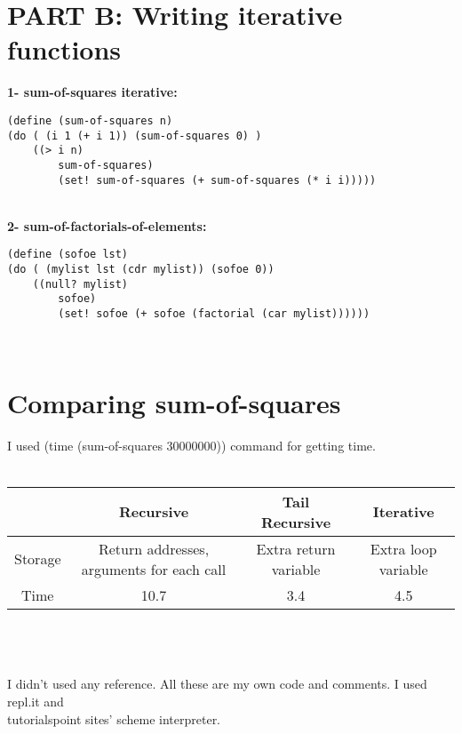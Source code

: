 \documentclass[11pt]{article}
\begin{document}
\section*{PART B: Writing iterative functions}

{\bf 1- sum-of-squares iterative:}\\
\begin{lstlisting}
(define (sum-of-squares n)
(do ( (i 1 (+ i 1)) (sum-of-squares 0) )
    ((> i n) 
        sum-of-squares)
        (set! sum-of-squares (+ sum-of-squares (* i i)))))
\end{lstlisting}
~\\
{\bf 2- sum-of-factorials-of-elements:}\\
\begin{lstlisting}
(define (sofoe lst)
(do ( (mylist lst (cdr mylist)) (sofoe 0))
    ((null? mylist) 
        sofoe)
        (set! sofoe (+ sofoe (factorial (car mylist))))))
\end{lstlisting}
~
\section*{Comparing sum-of-squares}
I used (time (sum-of-squares 30000000)) command for getting time.\\~\\
\begin{tabular} {|c|c|c|c|}
 \hline
 & Recursive & Tail Recursive & Iterative \\
\hline
Storage & Return addresses, arguments for each call & Extra return variable & Extra loop variable \\
\hline
Time & 10.7 & 3.4 & 4.5 \\
\hline
\end{tabular}\\~\\~\\
I didn't used any reference. All these are my own code and comments. I used repl.it and \\tutorialspoint sites' scheme interpreter.
\end{document}
